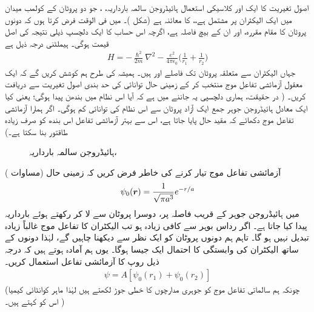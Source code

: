  اصول تغیریت کا ایک اور کلاسیکی استعمال ہائیڈروجن سالمہ بارداریہ، ، جو دو پروٹان کے کولمب میدان میں ایک الیکٹران پر مشتمل ہے،، کا معائنہ ہے (شکل )۔ میں فی الوقت فرض کرتا ہوں کہ دونوں پروٹان کا مقام مقررہ، اور ان کے بیچ فاصلہ  ہے، اگرچہ اس حساب کا ایک دلچسپ ذیلی نتیجہ  کی اصل قیمت ہوگی۔ ہیملٹنی درجہ ذیل ہے
 \begin{align}\label{مساوات_تغیریت_ہائیڈروجن_ہیملٹنی}
H=-\frac{\hslash^{2}}{2m}\nabla^{2}-\frac{e^{2}}{4\pi\epsilon_{0}}\big(\frac{1}{r_{1}}+\frac{1}{r_{2}}\big)
\end{align}
 جہاں الیکٹران سے متعلقہ پروٹان تک فاصلے  اور ہیں۔ ہمیشہ کی طرح ہم کوشش کریں گے کہ ایک معقول آزمائشی تفاعل موج منتخب کر کے زمینی حال توانائی کی حد بندی اصول تغیریت سے دریافت کریں۔ ( در حقیقت، ہماری دلچسپی یہ جاننے میں ہے کہ آیا اس نظام میں بندھن پیدا ہوگی؛ یعنی کیا ایک معادل ہائیڈروجن جوہر جمع ایک آزاد پروٹان سے اس نظام کی توانائی کم ہوگی۔ اگر ہمارا آزمائشی تفاعل موج دکھائے کہ مقید حال پایا جاتا ہے، اس سے بہتر آزمائشی تفاعل اس بندھ کو صرف زیادہ طاقتور بنا سکتا ہے۔)
\begin{figure} \centering
{} 
\caption{ہائیڈروجن سالمہ بارداریہ، } 
\label{شکل_تغیریت_ہائیڈروجن_سالمہ_بارداریہ} 
\end{figure} 

 آزمائشی تفاعل موج تیار کرنے کی خاطر فرض کریں کہ زمینی حال (مساوات )
\begin{align}
\psi_{0}({{\boldsymbol{r}}})=\frac{1}{\sqrt{\pi a^{3}}}e^{-r/a} 
\end{align}
 میں ہائیڈروجن جوہر کے قریب فاصلہ  پر، دوسرا پروٹان  سے لا کر رکھتے ہوئے بارداریہ پیدا کیا جاتا ہے۔ اگر رداس بوہر سے  کافی زیادہ ہو تب الیکٹران کا تفاعل موج غالباً زیادہ تبدیل نہیں ہو گا۔ تاہم ہم دونوں پروٹان کو ایک نظر سے دیکھنا چاہیں گے، لہٰذا دونوں کے ساتھ الیکٹران کی وابستگی کا احتمال ایک جیسا ہوگا۔ یوں ہم آمادہ ہوتے ہیں کہ درجہ ذیل روپ کا آزمائشی تفاعل استعمال کریں۔ 
 \begin{align}\label{مساوات_تغیریت_آزمائشی_تفاعل}
\psi=A[\psi_{0}(r_{1})+\psi_{0}(r_{2})]
\end{align}
(چونکہ ہم سالماتی تفاعل موج کو جوہری مدارچوں کا خطی جوڑ لکھتے ہیں لہٰذا ماہر کوانٹائی کیمیا اس کو  کہتے ہیں۔ )

